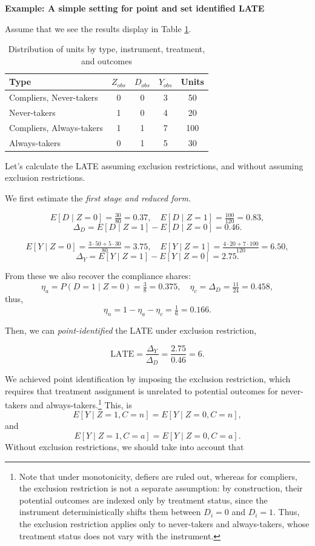 \textbf{Example: A simple setting for point and set identified LATE}

Assume that we see the results display in Table \ref{tab:types}.

\begin{table}[ht]
	\centering
	\caption{Distribution of units by type, instrument, treatment, and outcomes}
	\label{tab:types}
	\begin{tabular}{lcccc}
		\hline
		Type & $Z_{obs}$ & $D_{obs}$ & $Y_{obs}$ & Units \\
		\hline
		Compliers, Never-takers & 0 & 0 & 3 & 50 \\
		Never-takers   & 1 & 0 & 4 & 20  \\
		Compliers, Always-takers & 1 & 1 & 7 & 100  \\
		 Always-takers   & 0 & 1 & 5 & 30  \\
		\hline
	\end{tabular}
\end{table}

Let's calculate the LATE assuming exclusion restrictions, and without assuming exclusion restrictions.

We first estimate the \textit{first stage and reduced form.}

\[
E[D \mid Z=0] = \tfrac{30}{80} = 0.37, \quad
E[D \mid Z=1] = \tfrac{100}{120} = 0.83,
\]
\[
\Delta_D = E[D \mid Z=1] - E[D \mid Z=0] = 0.46.
\]

\[
E[Y \mid Z=0] = \tfrac{3 \cdot 50 + 5 \cdot 30}{80} = 3.75, \quad
E[Y \mid Z=1] = \tfrac{4 \cdot 20 + 7 \cdot 100}{120} = 6.50,
\]
\[
\Delta_Y = E[Y \mid Z=1] - E[Y \mid Z=0] = 2.75.
\]

From these we also recover the compliance shares:
\[
\eta_a = P(D=1 \mid Z=0) = \tfrac{3}{8}=0.375, \quad
\eta_c = \Delta_D = \tfrac{11}{24}=0.458,
\]
thus,
\[
\eta_n = 1 - \eta_a - \eta_c = \tfrac{1}{6}=0.166.
\]

Then, we can \textit{point-identified} the LATE under exclusion restriction,

\[
\text{LATE} = \frac{\Delta_Y}{\Delta_D}
= \frac{2.75}{0.46}
= 6.
\]

We achieved point identification by imposing the exclusion restriction, which requires that treatment assignment is unrelated to potential outcomes for never-takers and always-takers.\footnote{Note that under monotonicity, defiers are ruled out, whereas for compliers, the exclusion restriction is not a separate assumption: by construction, their potential outcomes are indexed only by treatment status, since the instrument deterministically shifts them between $D_i=0$ and $D_i=1$. Thus, the exclusion restriction applies only to never-takers and always-takers, whose treatment status does not vary with the instrument.} This, is
\[
E[Y \mid Z=1, C=n] = E[Y \mid Z=0, C=n],
\]
and
\[
E[Y \mid Z=1, C=a] = E[Y \mid Z=0, C=a].
\]
Without exclusion restrictions, we should take into account that 

